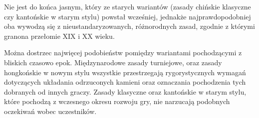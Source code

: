 Nie jest do końca jasnym, który ze starych wariantów (zasady chińskie klasyczne
czy kantońskie w starym stylu) powstał wcześniej, jednakże najprawdopodobniej
oba wywodzą się z nieustandaryzowanych, różnorodnych zasad, zgodnie z którymi
granona przełomie XIX i XX wieku.

Można dostrzec najwięcej podobieństw pomiędzy wariantami pochodzącymi z bliskich
czasowo epok. Międzynarodowe zasady turniejowe,  oraz zasady
hongkońskie w nowym stylu wszystkie przestrzegają rygorystycznych wymagań
dotyczących układania odrzuconych kamieni oraz oznaczania pochodzenia
tych dobranych od innych graczy. Zasady klasyczne oraz kantońskie w starym
stylu, które pochodzą z wczesnego okresu rozwoju gry, nie narzucają podobnych
oczekiwań wobec uczestników.
